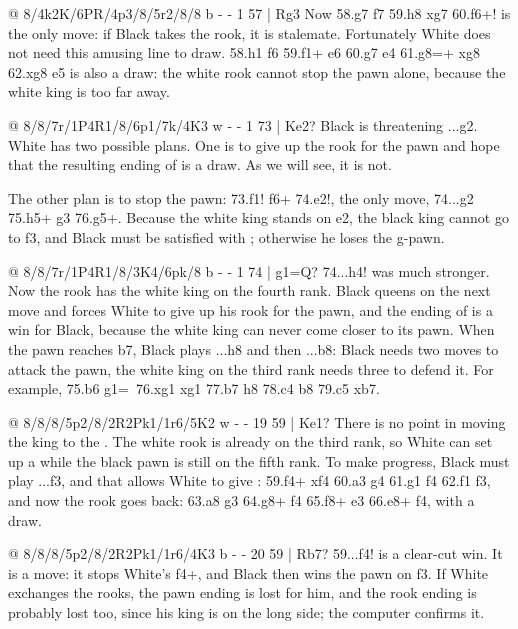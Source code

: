 @ 8/4k2K/6PR/4p3/8/5r2/8/8 b - - 1 57 | Rg3
Now 58.g7 \K f7 59.\K h8 \R xg7 60.\R f6+! is the only move: if Black takes the rook, it is
stalemate. Fortunately White does not need this amusing line to
draw. 58.\R h1 \K f6 59.\R f1+ \K e6 60.g7 e4 61.g8=\Q+ \R xg8 62.\K xg8 \K e5 is also a draw: the
white rook cannot stop the pawn alone, because the white king is too far
away.

@ 8/8/7r/1P4R1/8/6p1/7k/4K3 w - - 1 73 | Ke2?
Black is threatening ...g2. White has two possible plans. One is to give up the rook for the pawn
and hope that the resulting ending of
 is a
draw. As we will see, it is not.

The other plan is to stop the pawn: 73.\K f1! \R f6+ 74.\K e2!, the only move, 74...g2 75.\R h5+
\K g3 76.\R g5+. Because the white king stands on e2, the black king cannot go to f3, and Black
must be satisfied with ; otherwise he loses the g-pawn.

@ 8/8/7r/1P4R1/8/3K4/6pk/8 b - - 1 74 | g1=Q?
74...\R h4! was much stronger. Now the rook has  the white king on the fourth
rank. Black queens on the next move and forces White to give up his
rook for the pawn, and the ending of  is a win for
Black, because the white king can never come closer to its
pawn. When the pawn reaches b7, Black plays ...\R h8 and then ...\R b8: Black needs two moves to
attack the pawn, the white king on the third rank needs three to defend it. For example, 75.b6
g1=\Q\ 76.\R xg1 \K xg1 77.b7 \R h8 78.\K c4 \R b8 79.\K c5 \R xb7.

@ 8/8/8/5p2/8/2R2Pk1/1r6/5K2 w - - 19 59 | Ke1?
There is no point in moving the king to the . The
white rook is already on the third rank, so White can set up a
 while the black pawn is still on the fifth
rank. To make progress, Black must play ...f3, and that allows White to give
: 59.f4+ \K xf4 60.\R a3 \K g4 61.\K g1 f4
62.\K f1 f3, and now the rook goes back: 63.\R a8 \K g3 64.\R g8+ \K f4 65.\R f8+ \K e3 66.\R e8+
\K f4, with a draw.

@ 8/8/8/5p2/8/2R2Pk1/1r6/4K3 b - - 20 59 | Rb7?
59...f4! is a clear-cut win. It is a
 move: it stops White's f4+, and Black then wins
the pawn on f3. If White exchanges the rooks, the pawn ending is lost for him, and the rook ending
is probably lost too, since his king is on the long side; the computer confirms it.

